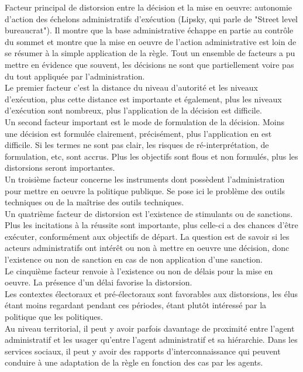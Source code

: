 \documentclass[10pt, a4paper, openany]{book}
\begin{document}
Facteur principal de distorsion entre la décision et la mise en oeuvre: autonomie d'action des échelons administratifs d'exécution (Lipsky, qui parle de "Street level bureaucrat"). Il montre que la base administrative échappe en partie au contrôle du sommet et montre que la mise en oeuvre de l'action administrative est loin de se résumer à la simple application de la règle. Tout un ensemble de facteurs a pu mettre en évidence que souvent, les décisions ne sont que partiellement voire pas du tout appliquée par l'administration. \\
Le premier facteur c'est la distance du niveau d'autorité et les niveaux d'exécution, plus cette distance est importante et également, plus les niveaux d'exécution sont nombreux, plus l'application de la décision est difficile. \\
Un second facteur important est le mode de formulation de la décision. Moins une décision est formulée clairement, précisément, plus l'application en est difficile. Si les termes ne sont pas clair, les risques de ré-interprétation, de formulation, etc, sont accrus. Plus les objectifs sont flous et non formulés, plus les distorsions seront importantes. \\
Un troisième facteur concerne les instruments dont possèdent l'administration pour mettre en oeuvre la politique publique. Se pose ici le problème des outils techniques ou de la maîtrise des outils techniques. \\
Un quatrième facteur de distorsion est l'existence de stimulants ou de sanctions. Plus les incitations à la réussite sont importante, plus celle-ci a des chances d'être exécuter, conformément aux objectifs de départ. La question est de savoir si les acteurs administratifs ont intérêt ou non à mettre en oeuvre une décision, donc l'existence ou non de sanction en cas de non application d'une sanction. \\
Le cinquième facteur renvoie à l'existence ou non de délais pour la mise en oeuvre. La présence d'un délai favorise la distorsion. \\
Les contextes électoraux et pré-électoraux sont favorables aux distorsions, les élus étant moins regardant pendant ces périodes, étant plutôt intéressé par la politique que les politiques. \\
Au niveau territorial, il peut y avoir parfois davantage de proximité entre l'agent administratif et les usager qu'entre l'agent administratif et sa hiérarchie. Dans les services sociaux, il peut y avoir des rapports d'interconnaissance qui peuvent conduire à une adaptation de la règle en fonction des cas par les agents. \\
\end{document}
